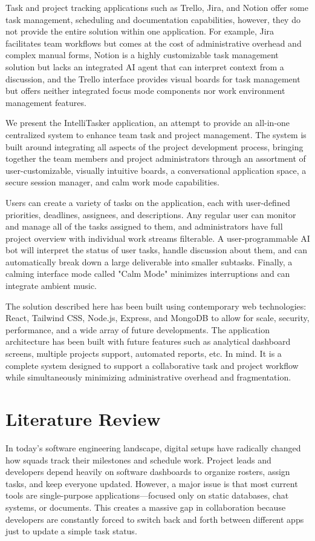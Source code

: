 \documentclass[conference]{IEEEtran}
\begin{document}
Task and project tracking applications such as Trello, Jira, and Notion offer some task management, scheduling and documentation capabilities, however, they do not provide the entire solution within one application. For example, Jira facilitates team workflows but comes at the cost of administrative overhead and complex manual forms, Notion is a highly customizable task management solution but lacks an integrated AI agent that can interpret context from a discussion, and the Trello interface provides visual boards for task management but offers neither integrated focus mode components nor work environment management features.

We present the IntelliTasker application, an attempt to provide an all-in-one centralized system to enhance team task and project management. The system is built around integrating all aspects of the project development process, bringing together the team members and project administrators through an assortment of user-customizable, visually intuitive boards, a conversational application space, a secure session manager, and calm work mode capabilities.

Users can create a variety of tasks on the application, each with user-defined priorities, deadlines, assignees, and descriptions. Any regular user can monitor and manage all of the tasks assigned to them, and administrators have full project overview with individual work streams filterable. A user-programmable AI bot will interpret the status of user tasks, handle discussion about them, and can automatically break down a large deliverable into smaller subtasks. Finally, a calming interface mode called "Calm Mode" minimizes interruptions and can integrate ambient music.

The solution described here has been built using contemporary web technologies: React, Tailwind CSS, Node.js, Express, and MongoDB to allow for scale, security, performance, and a wide array of future developments. The application architecture has been built with future features such as analytical dashboard screens, multiple projects support, automated reports, etc. In mind. It is a complete system designed to support a collaborative task and project workflow while simultaneously minimizing administrative overhead and fragmentation.

\section{Literature Review}
In today's software engineering landscape, digital setups have radically changed how squads track their milestones and schedule work. Project leads and developers depend heavily on software dashboards to organize rosters, assign tasks, and keep everyone updated. However, a major issue is that most current tools are single-purpose applications—focused only on static databases, chat systems, or documents. This creates a massive gap in collaboration because developers are constantly forced to switch back and forth between different apps just to update a simple task status.
\end{document}

